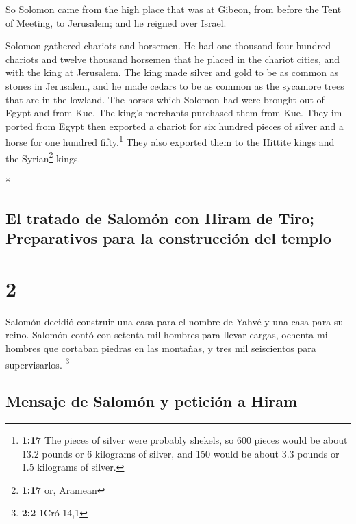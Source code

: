 \begin{paracol}{2}
\begin{otherlanguage}{english}
 So Solomon came from the high place that was at Gibeon,
from before the Tent of Meeting, to Jerusalem; and he reigned over
Israel.

 Solomon gathered chariots and horsemen. He had one
thousand four hundred chariots and twelve thousand horsemen that he
placed in the chariot cities, and with the king at Jerusalem.
 The king made silver and gold to be as common as stones
in Jerusalem, and he made cedars to be as common as the sycamore trees
that are in the lowland.  The horses which Solomon had
were brought out of Egypt and from Kue. The king's merchants purchased
them from Kue.  They imported from Egypt then exported a
chariot for six hundred pieces of silver and a horse for one hundred
fifty.\footnote{\textbf{1:17} The pieces of silver were probably
  shekels, so 600 pieces would be about 13.2 pounds or 6 kilograms of
  silver, and 150 would be about 3.3 pounds or 1.5 kilograms of silver.}
They also exported them to the Hittite kings and the Syrian\footnote{\textbf{1:17}
  or, Aramean} kings.

\end{otherlanguage}

\switchcolumn[0]*

\hypertarget{el-tratado-de-salomuxf3n-con-hiram-de-tiro-preparativos-para-la-construcciuxf3n-del-templo}{%
\subsection{El tratado de Salomón con Hiram de Tiro; Preparativos para
la construcción del
templo}\label{el-tratado-de-salomuxf3n-con-hiram-de-tiro-preparativos-para-la-construcciuxf3n-del-templo}}

\hypertarget{section-2}{%
\section{2}\label{section-2}}

 Salomón decidió construir una casa para el nombre de
Yahvé y una casa para su reino.  Salomón contó con setenta
mil hombres para llevar cargas, ochenta mil hombres que cortaban piedras
en las montañas, y tres mil seiscientos para supervisarlos. \footnote{\textbf{2:2}
  1Cró 14,1}

\hypertarget{mensaje-de-salomuxf3n-y-peticiuxf3n-a-hiram}{%
\subsection{Mensaje de Salomón y petición a
Hiram}\label{mensaje-de-salomuxf3n-y-peticiuxf3n-a-hiram}}


\end{paracol}

